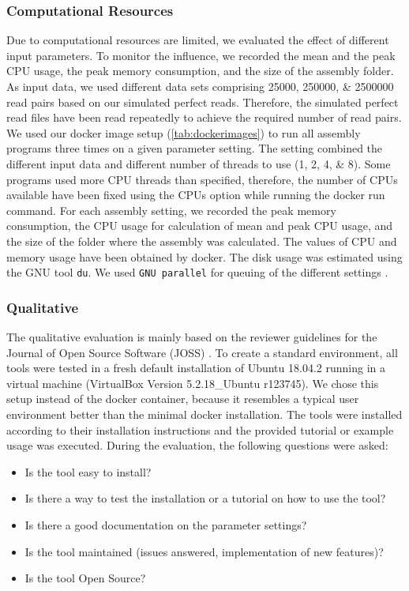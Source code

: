 \documentclass{bmcart}
\begin{document}
\subsubsection*{Computational Resources}
Due to computational resources are limited, we evaluated the effect of different input parameters.
To monitor the influence, we recorded the mean and the peak CPU usage, the peak memory consumption, and the size of the assembly folder. 
As input data, we used different data sets comprising \numlist{25000;250000;2500000} read pairs based on our simulated perfect reads.
Therefore, the simulated perfect read files have been read repeatedly to achieve the required number of read pairs.
We used our docker image setup (\cref{tab:dockerimages}) to run all assembly programs three times on a given parameter setting.
The setting combined the different input data and different number of threads to use (\numlist{1;2;4;8}).
Some programs used more CPU threads than specified, therefore, the number of CPUs available have been fixed using the CPUs option while running the docker run command.
For each assembly setting, we recorded the peak memory consumption, the CPU usage for calculation of mean and peak CPU usage, and the size of the folder where the assembly was calculated.
The values of CPU and memory usage have been obtained by docker.
The disk usage was estimated using the GNU tool \texttt{du}.
We used \texttt{GNU parallel} for queuing of the different settings \cite{Tange2011a}.

\subsubsection*{Qualitative}

The qualitative evaluation is mainly based on the reviewer guidelines for the Journal of Open Source Software (JOSS) \cite{joss}.
To create a standard environment, all tools were tested in a fresh default installation of Ubuntu 18.04.2 running in a virtual machine (VirtualBox Version 5.2.18\_Ubuntu r123745). We chose this setup instead of the docker container, because it resembles a typical user environment better than the minimal docker installation. The tools were installed according to their installation instructions and
the provided tutorial or example usage was executed. During the evaluation, the following
questions were asked:

\begin{itemize}
    \item Is the tool easy to install? 
    \item Is there a way to test the installation or a tutorial on how to use the tool? 
    \item Is there a good documentation on the parameter settings? 
    \item Is the tool maintained (issues answered, implementation of new features)? 
    \item Is the tool Open Source?
\end{itemize}
\end{document}
